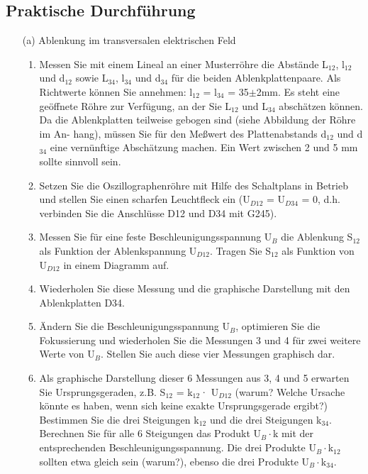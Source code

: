 \documentclass[12pt]{scrartcl}
\begin{document}
\subsection{Praktische Durchführung}
\begin{itemize}
\item[(a)] Ablenkung im transversalen elektrischen Feld
\newline
\begin{enumerate}
\item
Messen Sie mit einem Lineal an einer Musterröhre die Abstände
L$_{12}$, l$_{12}$ und d$_{12}$
sowie L$_{34}$, l$_{34}$ und d$_{34}$ für die beiden Ablenkplattenpaare. Als Richtwerte können Sie annehmen:
l$_{12}$ = l$_{34}$ = 35$\pm$2mm. Es steht eine geöffnete Röhre zur Verfügung,
an der Sie L$_{12}$ und L$_{34}$ abschätzen können.
Da die Ablenkplatten teilweise gebogen sind (siehe Abbildung der Röhre im An-
hang), müssen Sie für den Meßwert des Plattenabstands
d$_{12}$ und d$_{34}$ eine vernünftige Abschätzung machen. Ein Wert zwischen 2 und 5 mm sollte sinnvoll sein.
\item
Setzen Sie die Oszillographenröhre mit Hilfe des Schaltplans in %
Betrieb und stellen Sie einen scharfen Leuchtfleck ein (U$_{D12}$ = U$_{D34}$ = 0, d.h. verbinden Sie die Anschlüsse D12 und D34 mit G245).
\item
Messen Sie für eine feste Beschleunigungsspannung U$_{B}$
die Ablenkung S$_{12}$ als
Funktion der Ablenkspannung U$_{D12}$. Tragen Sie S$_{12}$
als Funktion von U$_{D12}$ in einem Diagramm auf.
\item
Wiederholen Sie diese Messung und die graphische Darstellung mit den Ablenkplatten D34.
\item
Ändern Sie die Beschleunigungsspannung U$_B$, optimieren Sie die Fokussierung
und wiederholen Sie die Messungen 3 und 4 für zwei weitere Werte von U$_B$. Stellen Sie auch diese vier Messungen graphisch dar.
\item
Als graphische Darstellung dieser 6 Messungen aus
3, 4 und 5 erwarten Sie Ursprungsgeraden, z.B. S$_{12}$ = k$_{12}$· U$_{D12}$ (warum? Welche Ursache könnte es
haben, wenn sich keine exakte Ursprungsgerade ergibt?)
Bestimmen Sie die drei Steigungen k$_{12}$ und die drei Steigungen k$_{34}$.
Berechnen Sie für alle 6 Steigungen das Produkt U$_B\cdot$k
mit der entsprechenden
Beschleunigungsspannung. Die drei Produkte U$_B\cdot$k$_{12}$
sollten etwa gleich sein
(warum?), ebenso die drei Produkte U$_B\cdot$k$_{34}$.

\end{enumerate}
\end{itemize}
\end{document}
